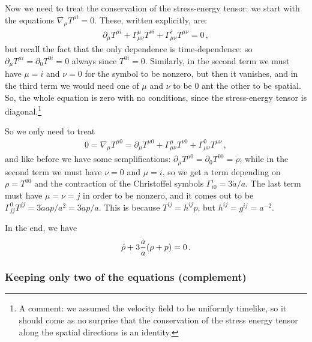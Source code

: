 \documentclass[main.tex]{subfiles}
\begin{document}
Now we need to treat the conservation of the stress-energy tensor: we start with the equations \(\nabla_{\mu } T^{\mu  i } = 0 \). These, written explicitly, are: 
%
\begin{align}
\partial_{\mu } T^{\mu i} + \Gamma^{\mu }_{\mu \nu } T^{\nu i } + \Gamma^{i}_{\mu \nu } T^{\mu \nu } =0 
\,,
\end{align}
%
but recall the fact that the only dependence is time-dependence: so \(\partial_{\mu } T^{\mu i} = \partial_{0} T^{0i}=0\) always since \(T^{0i}= 0\). 
Similarly, in the second term we must have \(\mu =i\) and \(\nu = 0\) for the symbol to be nonzero, but then it vanishes, and in the third term we would need one of \(\mu \) and \(\nu \) to be 0 ant the other to be spatial. So, the whole equation is zero with no conditions, since the stress-energy tensor is diagonal.\footnote{A comment: we assumed the velocity field to be uniformly timelike, so it should come as no surprise that the conservation of the stress energy tensor along the spatial directions is an identity.}

So we only need to treat 
%
\begin{align}
0=\nabla_{\mu } T^{\mu 0 }
= \partial_{\mu } T^{\mu 0} 
+ \Gamma^{\mu }_{\mu \nu } T^{\nu 0}
+ \Gamma^{0}_{\mu \nu } T^{\mu \nu }
\,,
\end{align}
%
and like before we have some semplifications: \(\partial_{\mu } T^{\mu 0} = \partial_{0} T^{00} = \dot{\rho}\); while in the second term we must have \(\nu = 0\) and \(\mu =i\), so we get a term depending on \(\rho = T^{00}\) and the contraction of the Christoffel symbols \(\Gamma^{i}_{i0} = 3 \dot{a} / a\). The last term must have \(\mu = \nu = j\) in order to be nonzero, and it comes out to be \(\Gamma^{0}_{jj} T^{jj} = 3 \dot{a} a p/ a^2 = 3 \dot{a} p / a\).
This is because \(T^{ij} = h^{ij} p\), but \(h^{ij} = g^{ij} = a^{-2}\). 

In the end, we have 
%
\begin{align}
\dot{\rho} + 3 \frac{\dot{a}}{a}\qty( \rho + p ) = 0 
\,.
\end{align}
%
\subsubsection{Keeping only two of the equations (complement)}
\end{document}
